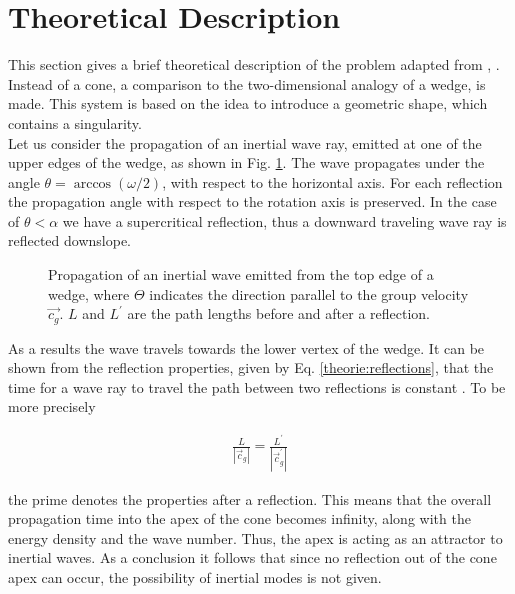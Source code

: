 \section{Theoretical Description}
\label{cone:theorie_theo}

This section gives a brief theoretical description of the problem adapted from \citep{Greenspan1969}, \citep{Beardsley1970}.
Instead of a cone, a comparison to the two-dimensional analogy of a wedge, is made.
This system is based on the idea to introduce a geometric shape, which contains a singularity.\\
Let us consider the propagation of an inertial wave ray, emitted at one of the upper edges of
the wedge, as shown in Fig. \ref{cone:theorie}.
The wave propagates under the angle $\theta = \arccos(\omega/2)$, with respect to the horizontal axis.
For each reflection the propagation angle with respect to the rotation axis is preserved.
In the case of $\theta<\alpha$ we have a supercritical reflection,
thus a downward traveling wave ray is reflected downslope.

\begin{figure}[!bp]
  \begin{minipage}[c]{0.6\textwidth}
      \centering
  \end{minipage}
  \begin{minipage}[c]{0.3\textwidth}
      \caption{
          Propagation of an inertial wave emitted from the top edge of a wedge,
           where $\Theta$ indicates the direction parallel to the group velocity
            $\vec{c_g}$.  $L$ and $L^{\prime}$ are the path lengths before and after a reflection.
      \label{cone:theorie}
      }
  \end{minipage}
\end{figure}

As a results the wave travels towards the lower vertex of the wedge.
It can be shown from the reflection properties, given by Eq. \ref{theorie:reflections},
that the time for a wave ray to travel the path between two reflections is constant \citep{Beardsley1970}.
To be more precisely

\begin{align}
    \frac{L}{|\vec{c}_g|} = \frac{L^{\prime}}{|\vec{c}_g^{\prime}|}
\end{align}

the prime denotes the properties after a reflection.
This means that the overall propagation time into the apex of the cone becomes infinity, along with the energy density and the wave number.
Thus, the apex is acting as an attractor to inertial waves.
As a conclusion it follows that since no reflection out of the cone apex can occur, the possibility of inertial modes is not given.

